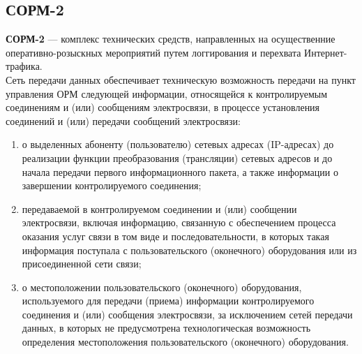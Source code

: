 \subsection{СОРМ-2}
\textbf{СОРМ-2} --- комплекс технических средств, направленных на осущественние оперативно-розыскных мероприятий путем логгирования и перехвата Интернет-трафика.\\
Сеть передачи данных обеспечивает техническую возможность передачи на пункт управления ОРМ следующей информации, относящейся к контролируемым соединениям и (или) сообщениям электросвязи, в процессе установления соединений и (или) передачи сообщений электросвязи\cite{sorm_sorm2}:
\begin{enumerate}
\item о выделенных абоненту (пользователю) сетевых адресах (IP-адресах) до реализации функции преобразования (трансляции) сетевых адресов и до начала передачи первого информационного пакета, а также информации о завершении контролируемого соединения;
\item передаваемой в контролируемом соединении и (или) сообщении электросвязи, включая информацию, связанную с обеспечением процесса оказания услуг связи в том виде и последовательности, в которых такая информация поступала с пользовательского (оконечного) оборудования или из присоединенной сети связи;
\item о местоположении пользовательского (оконечного) оборудования, используемого для передачи (приема) информации контролируемого соединения и (или) сообщения электросвязи, за исключением сетей передачи данных, в которых не предусмотрена технологическая возможность определения местоположения пользовательского (оконечного) оборудования.\end{enumerate}
